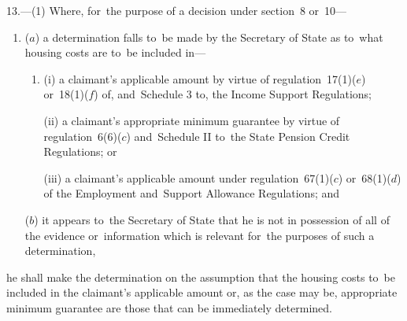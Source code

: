 \documentclass[12pt,a4paper]{article}
\begin{document}
13.—(1) Where, for~the purpose of a decision under section~8 or~10—
\begin{enumerate}\item[]

($a$) a determination falls to~be made by the Secretary of State as to~what housing costs are to~be included in—
\begin{enumerate}\item[]
(i) a claimant’s applicable amount by virtue of regulation~17(1)($e$)  or~18(1)($f$)  of, and~Schedule 3 to, the Income Support Regulations; 

(ii) a claimant’s appropriate minimum guarantee by virtue of regulation~6(6)($c$)  and~Schedule II to~the State Pension Credit Regulations; 
%
or

(iii) a claimant’s applicable amount under regulation~67(1)($c$)  or~68(1)($d$)  of the Employment and~Support Allowance Regulations; and
\end{enumerate}

($b$) it appears to~the Secretary of State that he is not in possession of all of the evidence or~information which is relevant for~the purposes of such a determination,
\end{enumerate}
he shall make the determination on the assumption that the housing costs to~be included in the claimant’s 
applicable amount or, as the case may be, appropriate minimum guarantee are those  %
that can be immediately determined.
\end{document}
